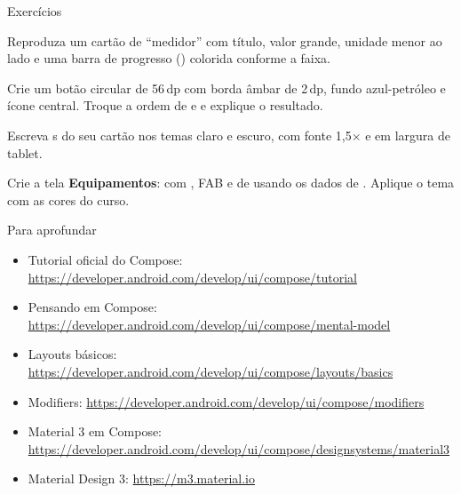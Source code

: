 \documentclass[aspectratio=169,10pt]{beamer}
\begin{document}
\begin{frame}{Exercícios}
  \begin{exercicio}
    Reproduza um cartão de ``medidor'' com título, valor grande, unidade menor ao lado e uma barra de progresso () colorida conforme a faixa.
  \end{exercicio}
  \begin{exercicio}
    Crie um botão circular de 56\,dp com borda âmbar de 2\,dp, fundo azul-petróleo e ícone central. Troque a ordem de  e  e explique o resultado.
  \end{exercicio}
  \begin{exercicio}
    Escreva s do seu cartão nos temas claro e escuro, com fonte 1,5$\times$ e em largura de tablet.
  \end{exercicio}
  \begin{projeto}
    Crie a tela \textbf{Equipamentos}:  com , FAB e  de  usando os dados de . Aplique o tema com as cores do curso.
  \end{projeto}
\end{frame}

\begin{frame}{Para aprofundar}
  \small
  \begin{itemize}
    \item Tutorial oficial do Compose: \url{https://developer.android.com/develop/ui/compose/tutorial}
    \item Pensando em Compose: \url{https://developer.android.com/develop/ui/compose/mental-model}
    \item Layouts básicos: \url{https://developer.android.com/develop/ui/compose/layouts/basics}
    \item Modifiers: \url{https://developer.android.com/develop/ui/compose/modifiers}
    \item Material 3 em Compose: \url{https://developer.android.com/develop/ui/compose/designsystems/material3}
    \item Material Design 3: \url{https://m3.material.io}
  \end{itemize}
\end{frame}
\end{document}
